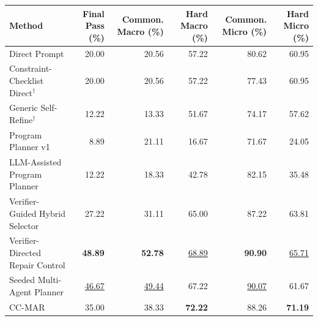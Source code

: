 \begin{tabular}{@{}lrrrrr@{}}
\toprule
Method & Final Pass (\%) & Common. Macro (\%) & Hard Macro (\%) & Common. Micro (\%) & Hard Micro (\%) \\
\midrule
Direct Prompt & 20.00 & 20.56 & 57.22 & 80.62 & 60.95 \\
Constraint-Checklist Direct$^{\dagger}$ & 20.00 & 20.56 & 57.22 & 77.43 & 60.95 \\
Generic Self-Refine$^{\dagger}$ & 12.22 & 13.33 & 51.67 & 74.17 & 57.62 \\
Program Planner v1 & 8.89 & 21.11 & 16.67 & 71.67 & 24.05 \\
LLM-Assisted Program Planner & 12.22 & 18.33 & 42.78 & 82.15 & 35.48 \\
Verifier-Guided Hybrid Selector & 27.22 & 31.11 & 65.00 & 87.22 & 63.81 \\
Verifier-Directed Repair Control & \textbf{48.89} & \textbf{52.78} & \underline{68.89} & \textbf{90.90} & \underline{65.71} \\
Seeded Multi-Agent Planner & \underline{46.67} & \underline{49.44} & 67.22 & \underline{90.07} & 61.67 \\
CC-MAR & 35.00 & 38.33 & \textbf{72.22} & 88.26 & \textbf{71.19} \\
\bottomrule
\end{tabular}
